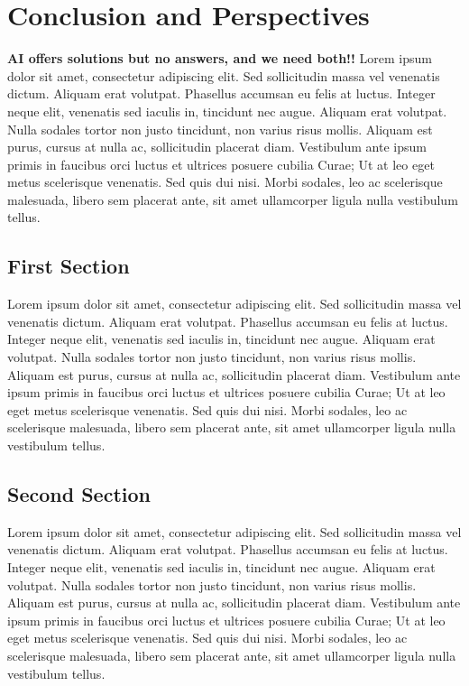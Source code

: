 \chapter{Conclusion and Perspectives}\label{ch:general_conclusion}
\textbf{AI offers solutions but no answers, and we need both!!}
Lorem ipsum dolor sit amet, consectetur adipiscing elit. Sed sollicitudin massa vel venenatis dictum. Aliquam erat volutpat. Phasellus accumsan eu felis at luctus. Integer neque elit, venenatis sed iaculis in, tincidunt nec augue. Aliquam erat volutpat. Nulla sodales tortor non justo tincidunt, non varius risus mollis. Aliquam est purus, cursus at nulla ac, sollicitudin placerat diam. Vestibulum ante ipsum primis in faucibus orci luctus et ultrices posuere cubilia Curae; Ut at leo eget metus scelerisque venenatis. Sed quis dui nisi. Morbi sodales, leo ac scelerisque malesuada, libero sem placerat ante, sit amet ullamcorper ligula nulla vestibulum tellus.

\section*{First Section}
Lorem ipsum dolor sit amet, consectetur adipiscing elit. Sed sollicitudin massa vel venenatis dictum. Aliquam erat volutpat. Phasellus accumsan eu felis at luctus. Integer neque elit, venenatis sed iaculis in, tincidunt nec augue. Aliquam erat volutpat. Nulla sodales tortor non justo tincidunt, non varius risus mollis. Aliquam est purus, cursus at nulla ac, sollicitudin placerat diam. Vestibulum ante ipsum primis in faucibus orci luctus et ultrices posuere cubilia Curae; Ut at leo eget metus scelerisque venenatis. Sed quis dui nisi. Morbi sodales, leo ac scelerisque malesuada, libero sem placerat ante, sit amet ullamcorper ligula nulla vestibulum tellus.

\section*{Second Section}
Lorem ipsum dolor sit amet, consectetur adipiscing elit. Sed sollicitudin massa vel venenatis dictum. Aliquam erat volutpat. Phasellus accumsan eu felis at luctus. Integer neque elit, venenatis sed iaculis in, tincidunt nec augue. Aliquam erat volutpat. Nulla sodales tortor non justo tincidunt, non varius risus mollis. Aliquam est purus, cursus at nulla ac, sollicitudin placerat diam. Vestibulum ante ipsum primis in faucibus orci luctus et ultrices posuere cubilia Curae; Ut at leo eget metus scelerisque venenatis. Sed quis dui nisi. Morbi sodales, leo ac scelerisque malesuada, libero sem placerat ante, sit amet ullamcorper ligula nulla vestibulum tellus.
